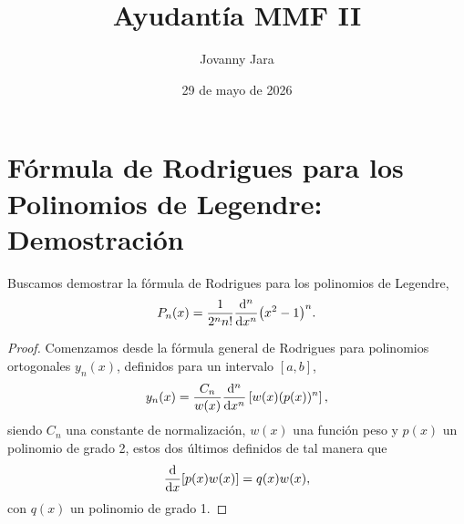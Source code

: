 \documentclass[11pt]{article}
\title{Ayudantía MMF II}
\author{Jovanny Jara}
\date{29 de mayo de 2026}
\theoremstyle{definition}
\numberwithin{equation}{section}
\begin{document}
\maketitle

\section{Fórmula de Rodrigues para los Polinomios de Legendre: Demostración}

Buscamos demostrar la fórmula de Rodrigues para los polinomios de Legendre, 
\begin{equation}
	P_n(x) = \frac{1}{2^n n!} \dv[n]{x} (x^2 - 1)^n.
\end{equation}

\begin{proof}
	Comenzamos desde la fórmula general de Rodrigues para polinomios ortogonales $y_n(x)$, definidos para un intervalo $[a,b]$,
	\begin{equation}
    y_n(x) = \frac{C_n}{w(x)} \dv[n]{x} \left[ w(x) (p(x))^n \right],
	\end{equation}
	siendo $C_n$ una constante de normalización, $w(x)$ una función peso y $p(x)$ un polinomio de grado 2, estos dos últimos definidos de tal manera que 
	\begin{equation}
    \dv{x} [p(x) w(x)] = q(x) w(x),
	\end{equation}
	con $q(x)$ un polinomio de grado 1.


\end{proof}
\end{document}

